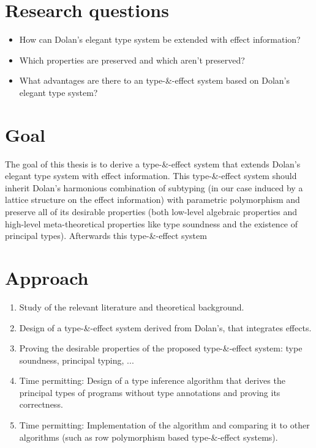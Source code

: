 \documentclass[notitlepage]{article}
\begin{document}
\section{Research questions}
\begin{itemize}
\item How can Dolan's elegant type system be extended with effect information?
\item Which properties are preserved and which aren't preserved?
\item What advantages are there to an type-\&-effect system based on Dolan's elegant type system?
\end{itemize}

\section{Goal}
The goal of this thesis is to derive a type-\&-effect system that extends Dolan's elegant type system with effect information. This type-\&-effect system should inherit Dolan's harmonious combination of subtyping (in our case induced by a lattice structure on the effect information) with parametric polymorphism and preserve all of its desirable properties (both low-level algebraic properties and high-level meta-theoretical properties like type soundness and the existence of principal types). Afterwards this type-\&-effect system

\section{Approach}
\begin{enumerate}
\item Study of the relevant literature and theoretical background.
\item Design of a type-\&-effect system derived from Dolan's, that integrates effects.
\item Proving the desirable properties of the proposed type-\&-effect system: type soundness, principal typing, ...
\item Time permitting: Design of a type inference algorithm that derives the principal types of programs without type annotations and proving its correctness.
\item Time permitting: Implementation of the algorithm and comparing it to other algorithms (such as row polymorphism based type-\&-effect systems).
\end{enumerate}

\nocite{*}
\printbibliography
\end{document}
